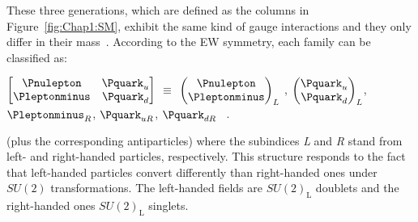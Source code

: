 These three generations, which are defined as the columns in Figure~\ref{fig:Chap1:SM}, exhibit the same kind of 
gauge interactions and they only differ in their mass~\cite{Salam:1968rm}. %
According to the EW symmetry, each family can be classified as:
\begin{center}
$\begin{bmatrix}
\Pnulepton & \ensuremath{\Pquark_{u}} \\
\Pleptonminus & \ensuremath{\Pquark_{d}} 
\end{bmatrix}$
$\equiv$
$\begin{pmatrix}
\Pnulepton \\
\Pleptonminus
\end{pmatrix}_{L}$ ,
$\begin{pmatrix}
\ensuremath{\Pquark_{u}} \\
\ensuremath{\Pquark_{d}} 
\end{pmatrix}_{L}$,
$\Pleptonminus_R$, $\ensuremath{\Pquark_{uR}}$, $\ensuremath{\Pquark_{dR}}$ \, .
\end{center}
(plus the corresponding antiparticles) where the subindices \textit{L} and \textit{R} stand from left- and right-handed particles, respectively. 
This structure responds to the fact that left-handed particles convert differently than right-handed ones under $SU(2)$ transformations.
The left-handed fields are $SU(2)_\text{L}$ doublets and the right-handed ones $SU(2)_\text{L}$ singlets. %

 

